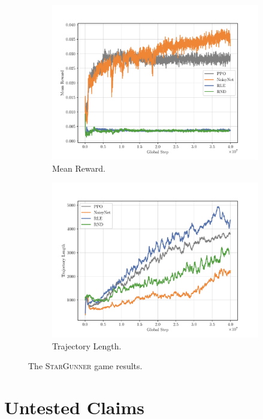 \begin{figure}[h!]
\begin{subfigure}[b]{0.45\textwidth}
    \includegraphics[width=\textwidth]{figures/plot_StarGunner_RewardsMean.pdf}
    \caption{Mean Reward.}
    \label{fig:stargunner-rewards}
  \end{subfigure}
  \hfill
  \begin{subfigure}[b]{0.45\textwidth}
    \centering
    \includegraphics[width=\textwidth]{figures/plot_StarGunner_TrajectoryLength.pdf}
    \caption{Trajectory Length.}
    \label{fig:stargunner-trajectorylength}
  \end{subfigure}
  \caption{The \textsc{StarGunner} game results.}
\end{figure}

\hypertarget{untested-claims}{\section{Untested Claims}}

